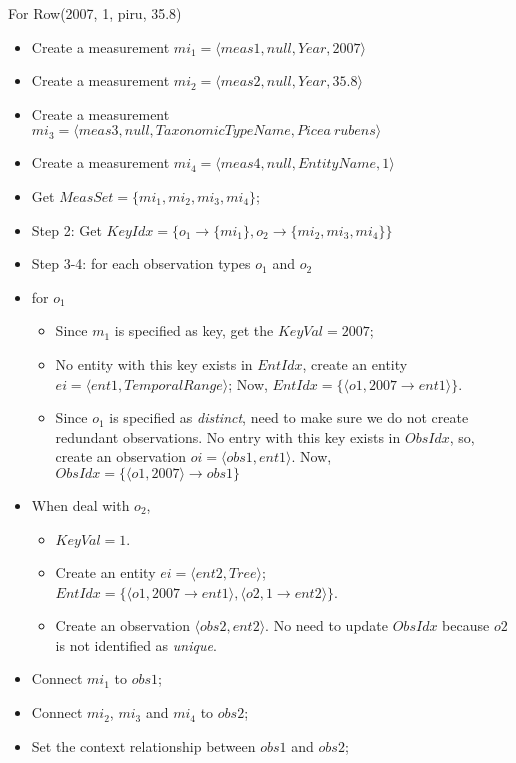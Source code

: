 \documentclass[10pt]{article}
\begin{document}
For Row(2007, 1, piru, 35.8)
    \begin{itemize}
    \item Create a measurement $mi_1=\langle meas1, null, Year, 2007\rangle$
    \item Create a measurement $mi_2=\langle meas2, null, Year, 35.8\rangle$
    \item Create a measurement $mi_3=\langle meas3, null, TaxonomicTypeName, Picea~rubens\rangle$
    \item Create a measurement $mi_4=\langle meas4, null, EntityName, 1\rangle$
    \item Get $MeasSet = \{mi_1, mi_2, mi_3, mi_4\}$;
    \item Step 2: Get $KeyIdx = \{o_1\rightarrow \{mi_1\}, o_2 \rightarrow \{mi_2, mi_3, mi_4\}\}$
    \item Step 3-4: for each observation types $o_1$ and $o_2$
    \item for $o_1$
    \begin{itemize}
        \item Since $m_1$ is specified as key, get the $KeyVal=2007$;
        \item No entity with this key exists in $EntIdx$, create an entity $ei=\langle ent1, TemporalRange\rangle$; Now, $EntIdx=\{\langle o1, 2007\rightarrow ent1\rangle\}$.
        \item Since $o_1$ is specified as {\em distinct}, need to make sure we do not create redundant observations. No entry with this key exists in $ObsIdx$, so, create an observation
        $oi = \langle obs1, ent1\rangle$. Now, $ObsIdx=\{\langle o1, 2007 \rangle \rightarrow obs1\}$
    \end{itemize}
    \item When deal with $o_2$,
        \begin{itemize}
        \item $KeyVal=1$.
        \item Create an entity $ei=\langle ent2, Tree\rangle$; $EntIdx=\{\langle o1, 2007\rightarrow ent1\rangle, \langle o2, 1\rightarrow ent2\rangle\}$.
        \item Create an observation $\langle obs2, ent2 \rangle$. No need to update $ObsIdx$ because $o2$ is not identified as {\em unique}.
        \end{itemize}
    \item Connect $mi_1$ to $obs1$;
    \item Connect $mi_2$, $mi_3$ and $mi_4$ to $obs2$;
    \item Set the context relationship between $obs1$ and $obs2$;
    \end{itemize}
\end{document}
